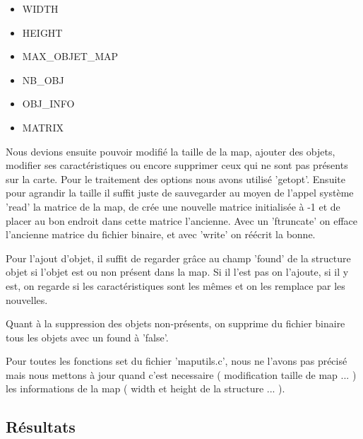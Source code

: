 \documentclass[a4paper]{article}
\newcommand{\cmark}{\ding{51}}%
\newcommand{\xmark}{\ding{55}}%
\newcommand{\done}{\rlap{$\square$}{\raisebox{2pt}{\large\hspace{1pt}\cmark}}%
\hspace{-2.5pt}}
\newcommand{\wontfix}{\rlap{$\square$}{\large\hspace{1pt}\xmark}}
\begin{document}
\begin{itemize}
\item WIDTH
\item HEIGHT
\item MAX_OBJET_MAP
\item NB_OBJ
\item OBJ_INFO
\item MATRIX
\end{itemize}

Nous devions ensuite pouvoir modifié la taille de la map, ajouter des objets, modifier ses caractéristiques ou encore supprimer ceux qui ne sont pas présents sur la carte.
Pour le traitement des options nous avons utilisé 'getopt'. Ensuite pour agrandir la taille il suffit juste de sauvegarder au moyen de l'appel système 'read' la matrice de la map, de crée une nouvelle matrice initialisée à -1 et de placer au bon endroit dans cette matrice l'ancienne. Avec un 'ftruncate' on efface l'ancienne matrice du fichier binaire, et avec 'write' on réécrit la bonne.

Pour l'ajout d'objet, il suffit de regarder grâce au champ 'found' de la structure objet si l'objet est ou non présent dans la map. Si il l'est pas on l'ajoute, si il y est, on regarde si les caractéristiques sont les mêmes et on les remplace par les nouvelles.

Quant à la suppression des objets non-présents, on supprime du fichier binaire tous les objets avec un found à 'false'.

Pour toutes les fonctions set du fichier 'maputils.c', nous ne l'avons pas précisé mais nous mettons à jour quand c'est necessaire ( modification taille de map ... ) les informations de la map ( width et height de la structure ... ).

\subsection{Résultats}
\end{document}
